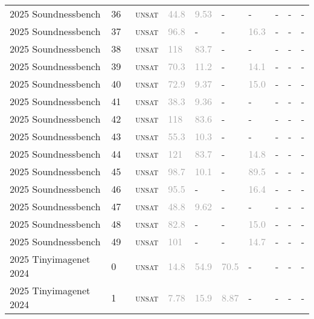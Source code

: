 \begin{center}
{\begin{longtable}{@{}llllllllll@{}}
2025 Soundnessbench & 36 & ~\textsc{unsat} & \textcolor{darkgray}{44.8} & \textcolor{darkgray}{9.53} & - & - & - & - & - \\
2025 Soundnessbench & 37 & ~\textsc{unsat} & \textcolor{darkgray}{96.8} & - & - & \textcolor{darkgray}{16.3} & - & - & - \\
2025 Soundnessbench & 38 & ~\textsc{unsat} & \textcolor{darkgray}{118} & \textcolor{darkgray}{83.7} & - & - & - & - & - \\
2025 Soundnessbench & 39 & ~\textsc{unsat} & \textcolor{darkgray}{70.3} & \textcolor{darkgray}{11.2} & - & \textcolor{darkgray}{14.1} & - & - & - \\
2025 Soundnessbench & 40 & ~\textsc{unsat} & \textcolor{darkgray}{72.9} & \textcolor{darkgray}{9.37} & - & \textcolor{darkgray}{15.0} & - & - & - \\
2025 Soundnessbench & 41 & ~\textsc{unsat} & \textcolor{darkgray}{38.3} & \textcolor{darkgray}{9.36} & - & - & - & - & - \\
2025 Soundnessbench & 42 & ~\textsc{unsat} & \textcolor{darkgray}{118} & \textcolor{darkgray}{83.6} & - & - & - & - & - \\
2025 Soundnessbench & 43 & ~\textsc{unsat} & \textcolor{darkgray}{55.3} & \textcolor{darkgray}{10.3} & - & - & - & - & - \\
2025 Soundnessbench & 44 & ~\textsc{unsat} & \textcolor{darkgray}{121} & \textcolor{darkgray}{83.7} & - & \textcolor{darkgray}{14.8} & - & - & - \\
2025 Soundnessbench & 45 & ~\textsc{unsat} & \textcolor{darkgray}{98.7} & \textcolor{darkgray}{10.1} & - & \textcolor{darkgray}{89.5} & - & - & - \\
2025 Soundnessbench & 46 & ~\textsc{unsat} & \textcolor{darkgray}{95.5} & - & - & \textcolor{darkgray}{16.4} & - & - & - \\
2025 Soundnessbench & 47 & ~\textsc{unsat} & \textcolor{darkgray}{48.8} & \textcolor{darkgray}{9.62} & - & - & - & - & - \\
2025 Soundnessbench & 48 & ~\textsc{unsat} & \textcolor{darkgray}{82.8} & - & - & \textcolor{darkgray}{15.0} & - & - & - \\
2025 Soundnessbench & 49 & ~\textsc{unsat} & \textcolor{darkgray}{101} & - & - & \textcolor{darkgray}{14.7} & - & - & - \\
\midrule
2025 Tinyimagenet 2024 & 0 & ~\textsc{unsat} & \textcolor{darkgray}{14.8} & \textcolor{darkgray}{54.9} & \textcolor{darkgray}{70.5} & - & - & - & - \\
2025 Tinyimagenet 2024 & 1 & ~\textsc{unsat} & \textcolor{darkgray}{7.78} & \textcolor{darkgray}{15.9} & \textcolor{darkgray}{8.87} & - & - & - & - \\

\end{longtable}}
\end{center}
